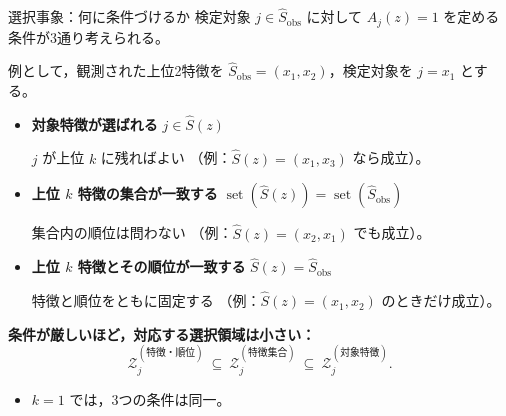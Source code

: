 \documentclass[aspectratio=169,11pt]{beamer}
\begin{document}
\begin{frame}{選択事象：何に条件づけるか}
  \small
  \setlength{\abovedisplayskip}{3pt}
  \setlength{\belowdisplayskip}{3pt}
  検定対象 $j\in\widehat S_{\mathrm{obs}}$ に対して
  $A_j(z)=1$ を定める条件が3通り考えられる。

  例として，観測された上位2特徴を
  $\widehat S_{\mathrm{obs}}=(x_1,x_2)$，検定対象を $j=x_1$ とする。

  \vspace{0.02cm}
  \begin{itemize}
    \setlength{\itemsep}{0.18cm}
    \item \textbf{対象特徴が選ばれる}
      \quad $j\in\widehat S(z)$

      $j$ が上位 $k$ に残ればよい
      （例：$\widehat S(z)=(x_1,x_3)$ なら成立）。

    \item \textbf{上位 $k$ 特徴の集合が一致する}
      \quad $\operatorname{set}(\widehat S(z))
        =\operatorname{set}(\widehat S_{\mathrm{obs}})$

      集合内の順位は問わない
      （例：$\widehat S(z)=(x_2,x_1)$ でも成立）。

    \item \textbf{上位 $k$ 特徴とその順位が一致する}
      \quad $\widehat S(z)=\widehat S_{\mathrm{obs}}$

      特徴と順位をともに固定する
      （例：$\widehat S(z)=(x_1,x_2)$ のときだけ成立）。
  \end{itemize}

  \vspace{1mm}
  \textbf{条件が厳しいほど，対応する選択領域は小さい：}
  \[
    \mathcal Z_j^{(\text{特徴・順位})}
    \ \subseteq\
    \mathcal Z_j^{(\text{特徴集合})}
    \ \subseteq\
    \mathcal Z_j^{(\text{対象特徴})}.
  \]
  \begin{itemize}
    \setlength{\topsep}{2pt}
    \item $k=1$ では，3つの条件は同一。
  \end{itemize}
  \vspace{-3pt}
\end{frame}
\end{document}
